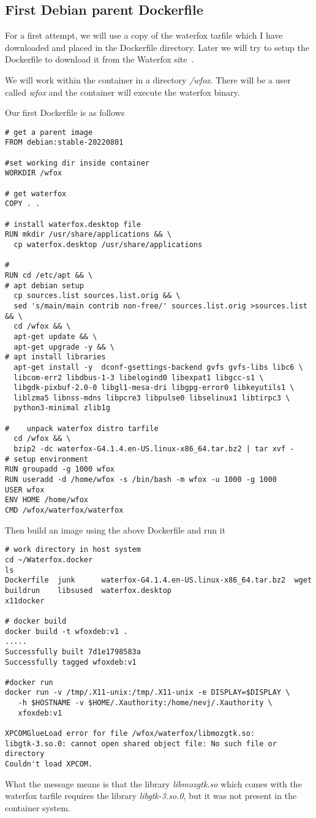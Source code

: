 \documentclass{article}  %
\begin{document}
\subsection{First Debian parent Dockerfile}
For a first attempt, we will use a copy of the waterfox tarfile which I have downloaded and placed in the Dockerfile directory. Later we will try to setup the Dockerfile to download it from the Waterfox site~\cite{wate:22b}.

We will work within the container in a directory {\em /wfox}. There will be a user called {\em wfox} and the container will execute the waterfox binary.

Our first Dockerfile is as follows
\begin{verbatim}
# get a parent image
FROM debian:stable-20220801

#set working dir inside container
WORKDIR /wfox

# get waterfox
COPY . .

# install waterfox.desktop file
RUN mkdir /usr/share/applications && \
  cp waterfox.desktop /usr/share/applications

#  
RUN cd /etc/apt && \
# apt debian setup
  cp sources.list sources.list.orig && \
  sed 's/main/main contrib non-free/' sources.list.orig >sources.list && \
  cd /wfox && \
  apt-get update && \
  apt-get upgrade -y && \
# apt install libraries
  apt-get install -y  dconf-gsettings-backend gvfs gvfs-libs libc6 \
  libcom-err2 libdbus-1-3 libelogind0 libexpat1 libgcc-s1 \
  libgdk-pixbuf-2.0-0 libgl1-mesa-dri libgpg-error0 libkeyutils1 \
  liblzma5 libnss-mdns libpcre3 libpulse0 libselinux1 libtirpc3 \
  python3-minimal zlib1g

#    unpack waterfox distro tarfile
  cd /wfox && \
  bzip2 -dc waterfox-G4.1.4.en-US.linux-x86_64.tar.bz2 | tar xvf - 
# setup environment
RUN groupadd -g 1000 wfox
RUN useradd -d /home/wfox -s /bin/bash -m wfox -u 1000 -g 1000
USER wfox
ENV HOME /home/wfox
CMD /wfox/waterfox/waterfox
\end{verbatim}
 Then build an image using the above Dockerfile and run it
\begin{verbatim}
# work directory in host system
cd ~/Waterfox.docker
ls
Dockerfile  junk      waterfox-G4.1.4.en-US.linux-x86_64.tar.bz2  wget
buildrun    libsused  waterfox.desktop                            x11docker

# docker build
docker build -t wfoxdeb:v1 .
.....
Successfully built 7d1e1798583a
Successfully tagged wfoxdeb:v1

#docker run
docker run -v /tmp/.X11-unix:/tmp/.X11-unix -e DISPLAY=$DISPLAY \
   -h $HOSTNAME -v $HOME/.Xauthority:/home/nevj/.Xauthority \
   xfoxdeb:v1

XPCOMGlueLoad error for file /wfox/waterfox/libmozgtk.so:
libgtk-3.so.0: cannot open shared object file: No such file or directory
Couldn't load XPCOM.
\end{verbatim}
 What the message means is that the library {\em libmozgtk.so} which comes with the waterfox tarfile requires the library {\em libgtk-3.so.0}, but it was not present in the container system.
\end{document}
